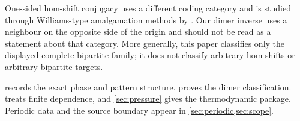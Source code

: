 One-sided hom-shift conjugacy uses a different coding category and is studied
through Williams-type amalgamation methods by \citet{BealBlockGorman2025}.
Our dimer inverse uses a neighbour on the opposite side of the origin and
should not be read as a statement about that category.  More generally, this
paper classifies only the displayed complete-bipartite family; it does not
classify arbitrary hom-shifts or arbitrary bipartite targets.

 records the exact phase and pattern structure.
 proves the dimer classification.
 treats finite dependence, and \cref{sec:pressure} gives the
thermodynamic package.  Periodic data and the source boundary appear in
\cref{sec:periodic,sec:scope}.
